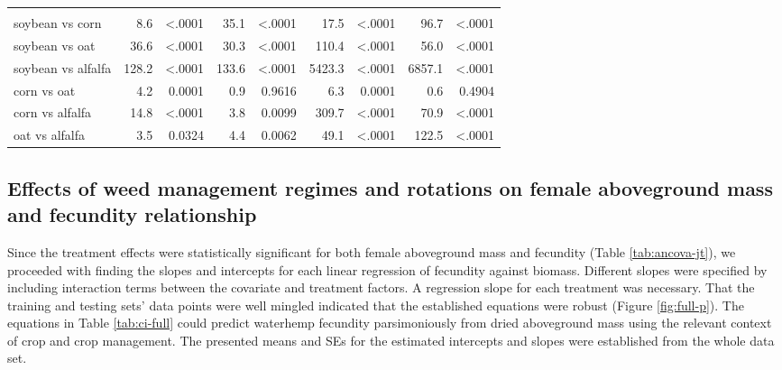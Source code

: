 \documentclass[utf8]{frontiersSCNS}
\begin{document}
\begin{table}
\begin{tabular}[t]{lrrr>{}r|rrrr}
\addlinespace[0.3em]
\multicolumn{9}{l}{\textbf{(B) - Crop species effects}}\\
\hspace{1em}soybean vs corn & 8.6 & <.0001 & 35.1 & <.0001 & 17.5 & <.0001 & 96.7 & <.0001\\
\hspace{1em}soybean vs oat & 36.6 & <.0001 & 30.3 & <.0001 & 110.4 & <.0001 & 56.0 & <.0001\\
\hspace{1em}soybean vs alfalfa & 128.2 & <.0001 & 133.6 & <.0001 & 5423.3 & <.0001 & 6857.1 & <.0001\\
\hspace{1em}corn vs oat & 4.2 & 0.0001 & 0.9 & 0.9616 & 6.3 & 0.0001 & 0.6 & 0.4904\\
\hspace{1em}corn vs alfalfa & 14.8 & <.0001 & 3.8 & 0.0099 & 309.7 & <.0001 & 70.9 & <.0001\\
\hspace{1em}oat vs alfalfa & 3.5 & 0.0324 & 4.4 & 0.0062 & 49.1 & <.0001 & 122.5 & <.0001\\
\bottomrule
\end{tabular}
\end{table}

\hypertarget{effects-of-weed-management-regimes-and-rotations-on-female-aboveground-mass-and-fecundity-relationship}{%
\subsection*{Effects of weed management regimes and rotations on female aboveground mass and fecundity relationship}\label{effects-of-weed-management-regimes-and-rotations-on-female-aboveground-mass-and-fecundity-relationship}}

Since the treatment effects were statistically significant for both female aboveground mass and fecundity (Table \ref{tab:ancova-jt}), we proceeded with finding the slopes and intercepts for each linear regression of fecundity against biomass. Different slopes were specified by including interaction terms between the covariate and treatment factors. A regression slope for each treatment was necessary. That the training and testing sets' data points were well mingled indicated that the established equations were robust (Figure \ref{fig:full-p}). The equations in Table \ref{tab:ci-full} could predict waterhemp fecundity parsimoniously from dried aboveground mass using the relevant context of crop and crop management. The presented means and SEs for the estimated intercepts and slopes were established from the whole data set.
\end{document}
